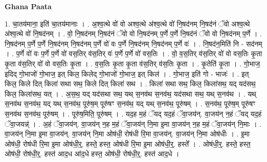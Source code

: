 \documentclass[17pt]{extarticle}
\begin{document}
\textbf{Ghana Paata } \newline

1. चा॒तय॑माना॒ इति॑ चा॒तय॑मानाः । . अ॒श्व॒त्थे वो॑ वो अश्व॒त्थे अ॑श्व॒त्थे वो॑ नि॒षद॑नम् नि॒षद॑नं ॅवो अश्व॒त्थे अ॑श्व॒त्थे वो॑ नि॒षद॑नम् । . वो॒ नि॒षद॑नम् नि॒षद॑नं ॅवो वो नि॒षद॑नम् प॒र्णे प॒र्णे नि॒षद॑नं ॅवो वो नि॒षद॑नम् प॒र्णे । . नि॒षद॑नम् प॒र्णे प॒र्णे नि॒षद॑नम् नि॒षद॑नम् प॒र्णे वो॑ वः प॒र्णे नि॒षद॑नम् नि॒षद॑नम् प॒र्णे वः॑ । . नि॒षद॑न॒मिति॑ नि - सद॑नम् । . प॒र्णे वो॑ वः प॒र्णे प॒र्णे वो॑ वस॒तिर् व॑स॒तिर् वः॑ प॒र्णे प॒र्णे वो॑ वस॒तिः । . वो॒ व॒स॒तिर् व॑स॒तिर् वो॑ वो वस॒तिः कृ॒ता कृ॒ता व॑स॒तिर् वो॑ वो वस॒तिः कृ॒ता । . व॒स॒तिः कृ॒ता कृ॒ता व॑स॒तिर् व॑स॒तिः कृ॒ता । . कृ॒तेति॑ कृ॒ता । . गो॒भाज॒ इदिद् गो॒भाजो॑ गो॒भाज॒ इत् किल॒ किलेद् गो॒भाजो॑ गो॒भाज॒ इत् किल॑ । . गो॒भाज॒ इति॑ गो - भाजः॑ । . इत् किल॒ किले दित् किला॑ सथा सथ॒ किले दित् किला॑ सथ । . किला॑ सथा सथ॒ किल॒ किला॑सथ॒ यद् यद॑सथ॒ किल॒ किला॑सथ॒ यत् । . अ॒स॒थ॒ यद् यद॑सथा सथ॒ यथ् स॒नव॑थ स॒नव॑थ॒ यद॑सथा सथ॒ यथ् स॒नव॑थ । . यथ् स॒नव॑थ स॒नव॑थ॒ यद् यथ् स॒नव॑थ॒ पूरु॑ष॒म् पूरु॑षꣳ स॒नव॑थ॒ यद् यथ् स॒नव॑थ॒ पूरु॑षम् । . स॒नव॑थ॒ पूरु॑ष॒म् पूरु॑षꣳ स॒नव॑थ स॒नव॑थ॒ पूरु॑षम् । . पूरु॑ष॒मिति॒ पूरु॑षम् । . यद॒ह म॒हं ॅयद् यद॒हं ॅवा॒जय॑न्. वा॒जय॑न् न॒हं ॅयद् यद॒हं ॅवा॒जयन्न्॑ । . अ॒हं ॅवा॒जय॑न्. वा॒जय॑न् न॒ह म॒हं ॅवा॒जय॑न् नि॒मा इ॒मा वा॒जय॑न् न॒ह म॒हं ॅवा॒जय॑न् नि॒माः । . वा॒जय॑न् नि॒मा इ॒मा वा॒जय॑न्. वा॒जय॑न् नि॒मा ओष॑धी॒ रोष॑धी रि॒मा वा॒जय॑न्. वा॒जय॑न् नि॒मा ओष॑धीः । . इ॒मा ओष॑धी॒ रोष॑धी रि॒मा इ॒मा ओष॑धी॒र्॒. हस्ते॒ हस्त॒ ओष॑धी रि॒मा इ॒मा ओष॑धी॒र्॒. हस्ते᳚ । . ओष॑धी॒र्॒. हस्ते॒ हस्त॒ ओष॑धी॒ रोष॑धी॒र्॒. हस्त॑ आद॒ध आ॑द॒धे हस्त॒ ओष॑धी॒ रोष॑धी॒र्॒. हस्त॑ आद॒धे । \newline
\end{document}
